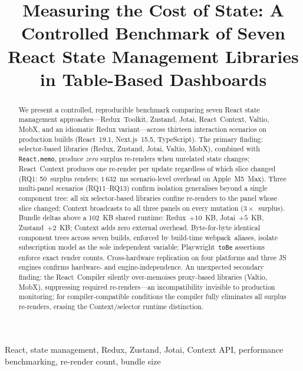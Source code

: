 \documentclass[conference]{IEEEtran}
\newcommand{\code}[1]{\texttt{\small #1}}
\begin{document}
\title{Measuring the Cost of State: A Controlled Benchmark of Seven
React State Management Libraries in Table-Based Dashboards}

\author{
}

\maketitle

\begin{abstract}
We present a controlled, reproducible benchmark comparing seven React
state management approaches---Redux~Toolkit, Zustand, Jotai,
React~Context, Valtio, MobX, and an idiomatic Redux variant---across
thirteen interaction scenarios on production builds (React~19.1,
Next.js~15.5, TypeScript). The primary finding: selector-based
libraries (Redux, Zustand, Jotai, Valtio, MobX), combined with
\code{React.memo}, produce \emph{zero} surplus re-renders when
unrelated state changes; React~Context produces one re-render per
update regardless of which slice changed (RQ1: 50~surplus renders;
$1\,632$~ms scenario-level overhead on Apple~M5~Max). Three
multi-panel scenarios (RQ11--RQ13) confirm isolation generalises
beyond a single component tree: all six selector-based libraries
confine re-renders to the panel whose slice changed; Context
broadcasts to all three panels on every mutation
($3{\times}$~surplus). Bundle deltas above a 102~KB shared runtime:
Redux~$+10$~KB, Jotai~$+5$~KB, Zustand~$+2$~KB; Context adds zero
external overhead. Byte-for-byte identical component trees across
seven builds, enforced by build-time webpack~aliases, isolate
subscription model as the sole independent variable;
Playwright~\code{toBe} assertions enforce exact render counts.
Cross-hardware replication on four platforms and three JS engines
confirms hardware- and engine-independence. An unexpected secondary
finding: the React~Compiler silently over-memoises proxy-based
libraries (Valtio, MobX), suppressing required re-renders---an
incompatibility invisible to production monitoring; for
compiler-compatible conditions the compiler fully eliminates all
surplus re-renders, erasing the Context/selector runtime distinction.
\end{abstract}

\begin{IEEEkeywords}
React, state management, Redux, Zustand, Jotai, Context API,
performance benchmarking, re-render count, bundle size
\end{IEEEkeywords}
\end{document}
